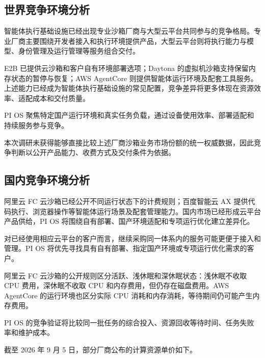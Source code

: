 \subsection{世界竞争环境分析}\label{sec:4.5.1}
智能体执行基础设施已经出现专业沙箱厂商与大型云平台共同参与的竞争格局。专业厂商主要围绕开发者接入和执行环境提供产品，大型云平台则将执行能力与模型、身份管理及运行管理等服务组合交付。

E2B 已提供云沙箱和客户自有环境部署选项；Daytona 的虚拟机沙箱支持保留内存状态的暂停与恢复；AWS AgentCore 则提供智能体运行环境及配套工具服务。上述能力已经成为智能体执行基础设施的常见配置，竞争差异将更多体现在资源效率、适配成本和交付质量。

PI OS 聚焦特定国产运行环境和真实任务负载，通过设备使用效率、部署适配和持续服务参与竞争。

本次调研未获得能够直接比较上述厂商沙箱业务市场份额的统一权威数据，因此竞争判断以公开产品能力、收费方式及交付条件为依据。

\subsection{国内竞争环境分析}\label{sec:4.5.2}
阿里云 FC 云沙箱已经公开不同运行状态下的计费规则；百度智能云 AX 提供代码执行、浏览器操作等智能体运行场景及配套管理能力。国内市场已经形成云平台产品供给，PI OS 将围绕自有部署、国产环境适配和专项运行优化建立差异化。

对已经使用相应云平台的客户而言，继续采购同一体系内的服务可能更便于接入和管理。PI OS 将优先寻找具有自有部署、指定国产环境或专项运行优化需求的客户。

阿里云 FC 云沙箱的公开规则区分活跃、浅休眠和深休眠状态：浅休眠不收取 CPU 费用，深休眠不收取 CPU 和内存费用，但仍存在磁盘费用。AWS AgentCore 的运行环境也区分实际 CPU 消耗和内存消耗，等待期间仍可能产生内存费用。

PI OS 的竞争验证将比较同一批任务的综合投入、资源回收等待时间、任务失败率和维护成本。

截至 2026 年 9 月 5 日，部分厂商公布的计算资源单价如下。

